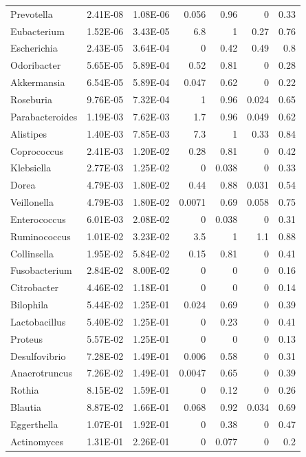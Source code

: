 {\begin{longtable}{ | l | r | r | r | r | r | r  | }
Prevotella & 2.41E-08 & 1.08E-06 & 0.056 & 0.96 & 0 & 0.33 \\ 
Eubacterium & 1.52E-06 & 3.43E-05 & 6.8 & 1 & 0.27 & 0.76 \\ 
Escherichia & 2.43E-05 & 3.64E-04 & 0 & 0.42 & 0.49 & 0.8 \\ 
Odoribacter & 5.65E-05 & 5.89E-04 & 0.52 & 0.81 & 0 & 0.28 \\ 
Akkermansia & 6.54E-05 & 5.89E-04 & 0.047 & 0.62 & 0 & 0.22 \\ 
Roseburia & 9.76E-05 & 7.32E-04 & 1 & 0.96 & 0.024 & 0.65 \\ 
Parabacteroides & 1.19E-03 & 7.62E-03 & 1.7 & 0.96 & 0.049 & 0.62 \\ 
Alistipes & 1.40E-03 & 7.85E-03 & 7.3 & 1 & 0.33 & 0.84 \\ 
Coprococcus & 2.41E-03 & 1.20E-02 & 0.28 & 0.81 & 0 & 0.42 \\ 
Klebsiella & 2.77E-03 & 1.25E-02 & 0 & 0.038 & 0 & 0.33 \\ 
Dorea & 4.79E-03 & 1.80E-02 & 0.44 & 0.88 & 0.031 & 0.54 \\ 
Veillonella & 4.79E-03 & 1.80E-02 & 0.0071 & 0.69 & 0.058 & 0.75 \\ 
Enterococcus & 6.01E-03 & 2.08E-02 & 0 & 0.038 & 0 & 0.31 \\ 
Ruminococcus & 1.01E-02 & 3.23E-02 & 3.5 & 1 & 1.1 & 0.88 \\ 
Collinsella & 1.95E-02 & 5.84E-02 & 0.15 & 0.81 & 0 & 0.41 \\ 
Fusobacterium & 2.84E-02 & 8.00E-02 & 0 & 0 & 0 & 0.16 \\ 
Citrobacter & 4.46E-02 & 1.18E-01 & 0 & 0 & 0 & 0.14 \\ 
Bilophila & 5.44E-02 & 1.25E-01 & 0.024 & 0.69 & 0 & 0.39 \\ 
Lactobacillus & 5.40E-02 & 1.25E-01 & 0 & 0.23 & 0 & 0.41 \\ 
Proteus & 5.57E-02 & 1.25E-01 & 0 & 0 & 0 & 0.13 \\ 
Desulfovibrio & 7.28E-02 & 1.49E-01 & 0.006 & 0.58 & 0 & 0.31 \\ 
Anaerotruncus & 7.26E-02 & 1.49E-01 & 0.0047 & 0.65 & 0 & 0.39 \\ 
Rothia & 8.15E-02 & 1.59E-01 & 0 & 0.12 & 0 & 0.26 \\ 
Blautia & 8.87E-02 & 1.66E-01 & 0.068 & 0.92 & 0.034 & 0.69 \\ 
Eggerthella & 1.07E-01 & 1.92E-01 & 0 & 0.38 & 0 & 0.47 \\ 
Actinomyces & 1.31E-01 & 2.26E-01 & 0 & 0.077 & 0 & 0.2 \\ 

\end{longtable}}
